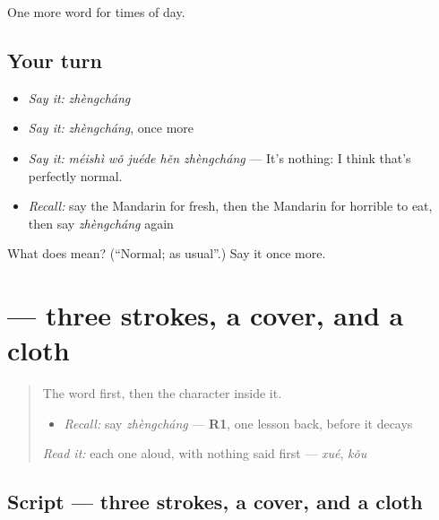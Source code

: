 \begin{grammarlens}[title={What you've built}]
One more word for times of day.
\end{grammarlens}

\subsection*{Your turn}
\begin{itemize}
\raggedright
  \item \emph{Say it:} \emph{zhèngcháng}
  \item \emph{Say it:} \emph{zhèngcháng}, once more
  \item \emph{Say it:} \emph{méishì wǒ juéde hěn zhèngcháng} — It's nothing: I think that's perfectly normal.
  \item \emph{Recall:} say the Mandarin for fresh, then the Mandarin for horrible to eat, then say \emph{zhèngcháng} again
\end{itemize}

\begin{tcolorbox}[breakable,colback=teal!4,colframe=teal!35!black,title={Before you move on}]
What does  mean? (\textquotedblleft{}Normal; as usual\textquotedblright{}.) Say it once more.
\end{tcolorbox}
\section[\texorpdfstring{\zh{常} (cháng)}{常 (cháng)}]{ — three strokes, a cover,  and a cloth}

\label{lesson:ZH-W178-chang-often}



\begin{quote}
The word first, then the character inside it.

\begin{itemize}
\raggedright
  \item \emph{Recall:} say \emph{zhèngcháng} — \textbf{R1}, one lesson back, before it decays
\end{itemize}

\begin{quote}
 
\end{quote}

\emph{Read it:} each one aloud, with nothing said first — \emph{xué}, \emph{kǒu}
\end{quote}

\subsection*{Script — three strokes, a cover,  and a cloth}

